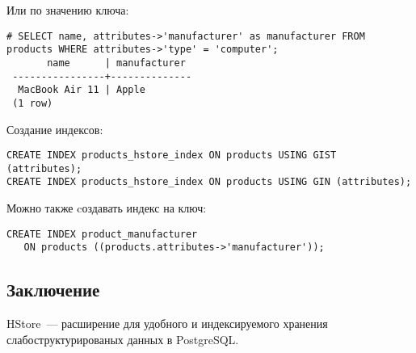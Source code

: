 Или по значению ключа:
\begin{lstlisting}[label=lst:hstore5,caption=Поиск по значению ключа]
# SELECT name, attributes->'manufacturer' as manufacturer FROM products WHERE attributes->'type' = 'computer';
       name      | manufacturer 
 ----------------+--------------
  MacBook Air 11 | Apple
 (1 row)
\end{lstlisting}

Создание индексов:
\begin{lstlisting}[label=lst:hstore6,caption=Индексы]
CREATE INDEX products_hstore_index ON products USING GIST (attributes);
CREATE INDEX products_hstore_index ON products USING GIN (attributes);
\end{lstlisting}

Можно также cоздавать индекс на ключ:
\begin{lstlisting}[label=lst:hstore7,caption=Индекс на ключ]
CREATE INDEX product_manufacturer 
   ON products ((products.attributes->'manufacturer'));
\end{lstlisting}

\subsection{Заключение}
HStore~--- расширение для удобного и индексируемого хранения слабоструктурированых данных в PostgreSQL.
